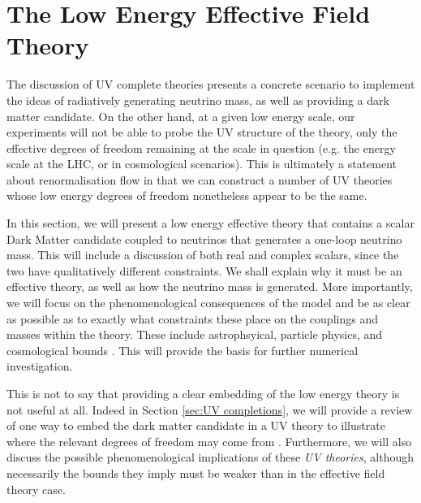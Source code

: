 \documentclass[10pt]{article}
\begin{document}
\section{The Low Energy Effective Field Theory}\label{sec:low energy theory}
The discussion of UV complete theories presents a concrete scenario to implement the ideas of radiatively generating neutrino mass, as well as providing a dark matter candidate. On the other hand, at a given low energy scale, our experiments will not be able to probe the UV structure of the theory, only the effective degrees of freedom remaining at the scale in question (e.g. the energy scale at the LHC, or in cosmological scenarios). This is ultimately a statement about renormalisation flow in that we can construct a number of UV theories whose low energy degrees of freedom nonetheless appear to be the same.

In this section, we will present a low energy effective theory that contains a scalar Dark Matter candidate coupled to neutrinos \cite{Farzan2014, Farzan2011, Farzan2010, Boehm2006, Farzan2009} that generates a one-loop neutrino mass. This will include a discussion of both real and complex scalars, since the two have qualitatively different constraints. We shall explain why it must be an effective theory, as well as how the neutrino mass is generated. More importantly, we will focus on the phenomenological consequences of the model and be as clear as possible as to exactly what constraints these place on the couplings and masses within the theory. These include astrophsyical, particle physics, and cosmological bounds \cite{Farzan2014, Farzan2011, Farzan2010, Boehm2006, Farzan2009}. This will provide the basis for further numerical investigation.

This is not to say that providing a clear embedding of the low energy theory is not useful at all. Indeed in Section \ref{sec:UV completions}, we will provide a review of one way to embed the dark matter candidate in a UV theory to illustrate where the relevant degrees of freedom may come from \cite{Farzan2009, Farzan2010a}. Furthermore, we will also discuss the possible phenomenological implications of these \textit{UV theories}, although necessarily the bounds they imply must be weaker than in the effective field theory case.
\end{document}

